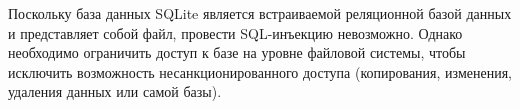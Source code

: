 Поскольку база данных SQLite является встраиваемой реляционной базой данных и представляет собой файл, провести SQL-инъекцию невозможно. Однако необходимо ограничить доступ к базе на уровне файловой системы, чтобы исключить возможность несанкционированного доступа (копирования, изменения, удаления данных или самой базы).

